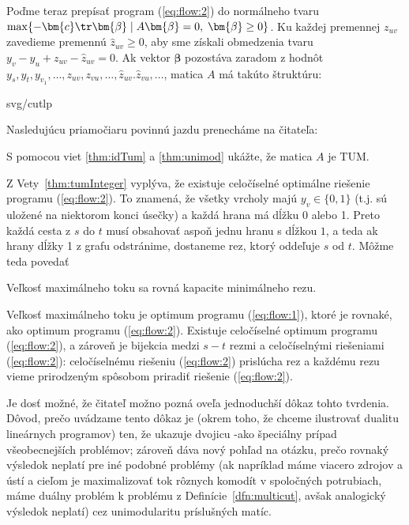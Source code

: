 \noindent
Poďme teraz prepísať program (\ref{eq:flow:2}) do normálneho tvaru 
$\max\{-\bm{c}\tr\bm{\beta}\mid A\bm{\beta}=0,\;\bm{\beta}\ge0\}$.
Ku každej premennej $z_{uv}$ zavedieme premennú $\hat{z}_{uv}\ge 0$, aby sme získali
obmedzenia tvaru \hbox{$y_v-y_u+z_{uv}-\hat{z}_{uv}=0$}.
Ak vektor  $\bm{\beta}$  pozostáva zaradom z hodnôt 
$y_s,y_t,y_{v_1},\ldots,z_{uv},z_{vu},\ldots,\hat{z}_{uv}.\hat{z}_{vu},\ldots$, 
matica $A$ má takúto štruktúru:

\begin{myfig}{0.8\textwidth}{svg/cutlp}
\end{myfig}

\noindent
Nasledujúcu priamočiaru povinnú jazdu prenecháme na čitateľa:

\begin{prob}
  S pomocou viet \ref{thm:idTum} a \ref{thm:unimod} ukážte, že matica $A$ je TUM.
\end{prob}


\noindent
Z Vety~\ref{thm:tumInteger} vyplýva, že existuje celočíselné optimálne riešenie programu (\ref{eq:flow:2}).
To znamená, že všetky vrcholy majú $y_v\in\{0,1\}$ (t.j. sú uložené na niektorom konci úsečky)
a každá hrana má dĺžku 0 alebo 1. Preto každá cesta z $s$ do $t$ musí obsahovať aspoň jednu hranu s dĺžkou $1$,
a teda ak hrany dĺžky 1 z grafu odstránime, dostaneme rez, ktorý oddeľuje $s$ od $t$. Môžme teda povedať

\begin{veta}
  Veľkosť maximálneho toku sa rovná kapacite minimálneho rezu.
\end{veta}
\begin{dokaz}
  Veľkosť maximálneho toku je optimum programu (\ref{eq:flow:1}), ktoré je rovnaké, ako optimum
  programu (\ref{eq:flow:2}). Existuje celočíselné optimum programu (\ref{eq:flow:2}), a zároveň
  je bijekcia medzi $s-t$ rezmi a celočíselnými riešeniami  (\ref{eq:flow:2}): celočíselnému riešeniu
  (\ref{eq:flow:2}) prislúcha rez a každému rezu vieme prirodzeným spôsobom priradiť riešenie  (\ref{eq:flow:2}).
\end{dokaz}

\noindent
Je dosť možné, že čitateľ možno pozná oveľa jednoduchší dôkaz tohto tvrdenia. Dôvod, prečo uvádzame tento dôkaz je
(okrem toho, že chceme ilustrovať dualitu lineárnych programov) ten, že ukazuje dvojicu 
\maxflow-\mincut ako špeciálny prípad všeobecnejších problémov; zároveň dáva nový pohľad na otázku, prečo
rovnaký výsledok neplatí pre iné podobné problémy (ak napríklad máme viacero zdrojov a ústí a cieľom je
maximalizovať tok rôznych komodít v spoločných potrubiach, máme duálny problém k problému
\minmulticut z Definície~\ref{dfn:multicut}, avšak analogický výsledok neplatí) cez unimodularitu príslušných matíc.

